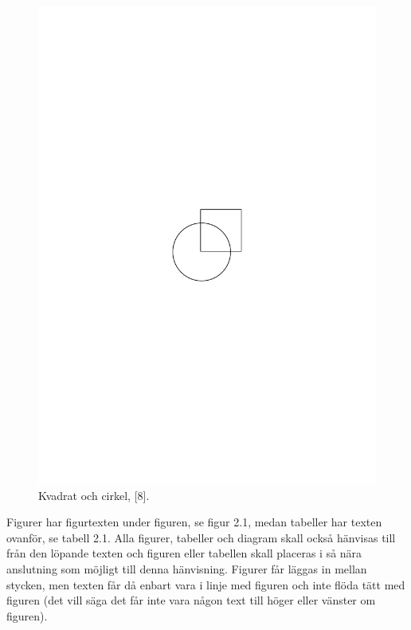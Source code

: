 \documentclass[a4paper,12pt]{article} %
\begin{document}
\begin{figure}[H]
\begin{center}
\includegraphics[scale=0.5]{img/cirkvad}
\end{center}
\caption{Kvadrat och cirkel, [8].}
\label{cir_kvad}
\end{figure}

Figurer har figurtexten under figuren, se figur 2.1, medan tabeller har texten ovanför, se tabell 2.1. Alla figurer, tabeller och diagram skall också hänvisas till från den löpande texten och figuren eller tabellen skall placeras i så nära anslutning som möjligt till denna hänvisning. Figurer får läggas in mellan stycken, men texten får då enbart vara i linje med figuren och inte flöda tätt med figuren (det vill säga det får inte vara någon text till höger eller vänster om figuren). \\
\end{document}
